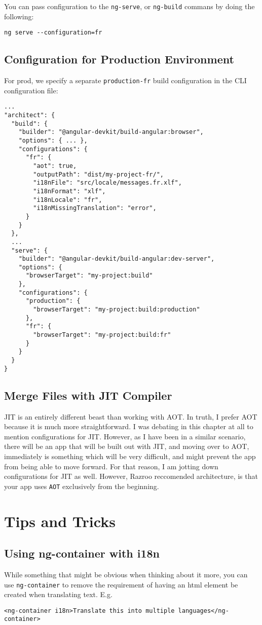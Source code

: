 You can pass configuration to the \lstinline{ng-serve}, or \lstinline{ng-build}
commans by doing the following: 
\begin{verbatim}
ng serve --configuration=fr
\end{verbatim}

\subsection{Configuration for Production Environment}
For prod, we specify a separate \lstinline{production-fr} build configuration 
in the CLI configuration file: 
\begin{lstlisting}[caption=angular.json]
...
"architect": {
  "build": {
    "builder": "@angular-devkit/build-angular:browser",
    "options": { ... },
    "configurations": {
      "fr": {
        "aot": true,
        "outputPath": "dist/my-project-fr/",
        "i18nFile": "src/locale/messages.fr.xlf",
        "i18nFormat": "xlf",
        "i18nLocale": "fr",
        "i18nMissingTranslation": "error",
      }
    }
  },
  ...
  "serve": {
    "builder": "@angular-devkit/build-angular:dev-server",
    "options": {
      "browserTarget": "my-project:build"
    },
    "configurations": {
      "production": {
        "browserTarget": "my-project:build:production"
      },
      "fr": {
        "browserTarget": "my-project:build:fr"
      }
    }
  }
}  
\end{lstlisting}

\subsection{Merge Files with JIT Compiler}
JIT is an entirely different beast than working with AOT. 
In truth, I prefer AOT because it is much more straightforward. I was debating 
in this chapter at all to mention configurations for JIT. However, as I have 
been in a similar scenario, there will be an app that will be built out with 
JIT, and moving over to AOT, immediately is something which will be very 
difficult, and might prevent the app from being able to move forward. For that
reason, I am jotting down configurations for JIT as well. However, Razroo 
reccomended architecture, is that your app uses \lstinline{AOT} exclusively 
from the beginning. 

\section{Tips and Tricks}
\subsection{Using ng-container with i18n}
While something that might be obvious when thinking about it more, you can use 
\lstinline{ng-container} to remove the requirement of having an html element 
be created when translating text. E.g. 
\begin{lstlisting}
<ng-container i18n>Translate this into multiple languages</ng-container>
\end{lstlisting}

